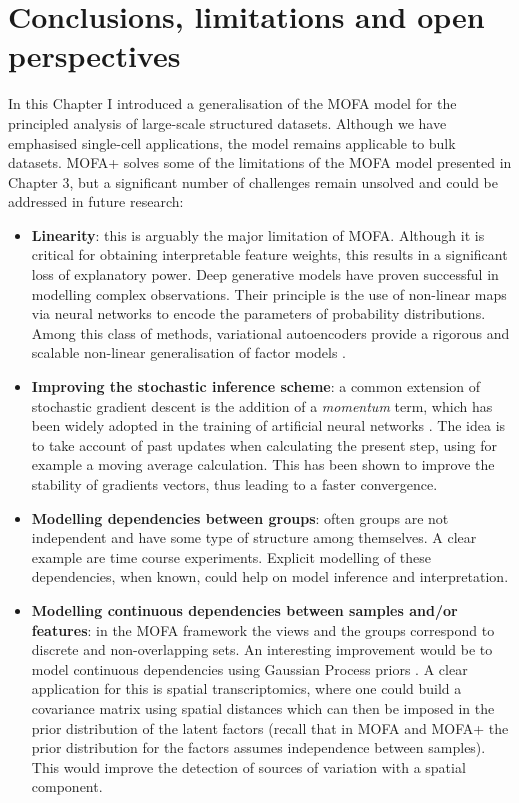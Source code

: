 \section{Conclusions, limitations and open perspectives}

In this Chapter I introduced a generalisation of the MOFA model for the principled analysis of large-scale structured datasets. Although we have emphasised single-cell applications, the model remains applicable to bulk datasets. MOFA+ solves some of the limitations of the MOFA model presented in Chapter 3, but a significant number of challenges remain unsolved and could be addressed in future research:

\begin{itemize}
	\item \textbf{Linearity}: this is arguably the major limitation of MOFA. Although it is critical for obtaining interpretable feature weights, this results in a significant loss of explanatory power. Deep generative models have proven successful in modelling complex observations. Their principle is the use of non-linear maps via neural networks to encode the parameters of probability distributions. Among this class of methods, variational autoencoders provide a rigorous and scalable non-linear generalisation of factor models \cite{Ainsworth2018}.

	\item \textbf{Improving the stochastic inference scheme}: a common extension of stochastic gradient descent is the addition of a \textit{momentum} term, which has been widely adopted in the training of artificial neural networks \cite{Zeiler2012,Ning1999}. The idea is to take account of past updates when calculating the present step, using for example a moving average calculation. This has been shown to improve the stability of gradients vectors, thus leading to a faster convergence.

	\item \textbf{Modelling dependencies between groups}: often groups are not independent and have some type of structure among themselves. A clear example are time course experiments. Explicit modelling of these dependencies, when known, could help on model inference and interpretation.

	\item \textbf{Modelling continuous dependencies between samples and/or features}: in the MOFA framework the views and the groups correspond to discrete and non-overlapping sets. An interesting improvement would be to model continuous dependencies using Gaussian Process priors \cite{Casale2018}. A clear application for this is spatial transcriptomics, where one could build a covariance matrix using spatial distances which can then be imposed in the prior distribution of the latent factors (recall that in MOFA and MOFA+ the prior distribution for the factors assumes independence between samples). This would improve the detection of sources of variation with a spatial component.
\end{itemize}